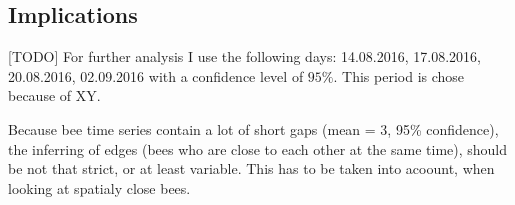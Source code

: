 \clearpage
\subsection{Implications}
[TODO]
For further analysis I use the following days: 14.08.2016, 17.08.2016, 20.08.2016, 02.09.2016 with a confidence level of $95\%$. This period is chose because of XY.

Because bee time series contain a lot of short gaps (mean = 3, 95\% confidence), the inferring of edges (bees who are close to each other at the same time), should be not that strict, or at least variable. This has to be taken into acoount, when looking at spatialy close bees.